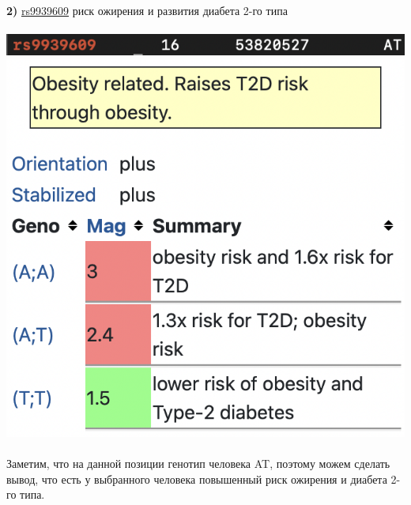 \documentclass[12pt]{article}
\begin{document}
\textbf{2)} \href{https://www.snpedia.com/index.php/Rs9939609}{rs9939609} риск ожирения и развития диабета 2-го типа\\\\
\includegraphics[width=\textwidth]{images/image5.png}\\
\includegraphics[width=\textwidth]{images/rs9939609.png}\\\\
Заметим, что на данной позиции генотип человека AT, поэтому можем сделать вывод, что есть у выбранного человека повышенный риск ожирения и диабета 2-го типа.
\newpage
\end{document}
